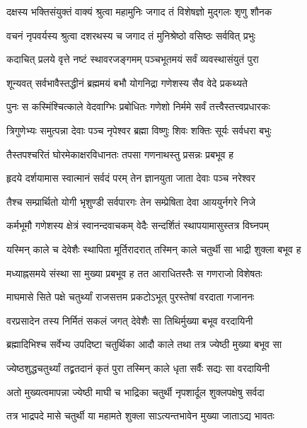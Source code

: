 \twolineshloka
{दक्षस्य भक्तिसंयुक्तं वाक्यं श्रुत्वा महामुनिः}
{जगाद तं विशेषज्ञो मुद्गलः श‍ृणु शौनक} %

\twolineshloka
{वचनं नृपवर्यस्य श्रुत्वा दशरथस्य च}
{जगाद तं मुनिश्रेष्ठो वसिष्ठः सर्ववित् प्रभुः} %


\twolineshloka
{कदाचित् प्रलये वृत्ते नष्टं स्थावरजङ्गमम्}
{पञ्चभूतमयं सर्वं व्यवस्थासंयुतं पुरा} %

\twolineshloka
{शून्यवत् सर्वभावैस्तद्धीनं ब्रह्ममयं बभौ}
{योगनिद्रा गणेशस्य सैव वेदे प्रकथ्यते} %

\twolineshloka
{पुनः स कस्मिंश्चित्काले वेदवाग्भिः प्रबोधितः}
{गणेशो निर्ममे सर्वं तत्त्वैस्तत्त्वप्रधारकः} %

\twolineshloka
{त्रिगुणेभ्यः समुत्पन्ना देवाः पञ्च नृपेश्वर}
{ब्रह्मा विष्णुः शिवः शक्तिः सूर्यः सर्वधरा बभुः} %

\twolineshloka
{तैस्तपश्चरितं घोरमेकाक्षरविधानतः}
{तपसा गणनाथस्तु प्रसन्नः प्रबभूव ह} %

\twolineshloka
{हृदये दर्शयामास स्वात्मानं सर्वदं परम्}
{तेन ज्ञानयुता जाता देवाः पञ्च नरेश्वर} %

\twolineshloka
{तैश्च सम्प्रार्थितो योगी भृशुण्डी सर्वपारगः}
{तेन सम्प्रेषिता देवा आययुर्नगरे निजे} %

\twolineshloka
{कर्मभूमौ गणेशस्य क्षेत्रं स्वानन्दवाचकम्}
{वेदैः सन्दर्शितं स्थापयामासुस्तत्र विघ्नपम्} %

\twolineshloka
{यस्मिन् काले च देवेशैः स्थापिता मूर्तिरादरात्}
{तस्मिन् काले चतुर्थी सा भाद्री शुक्ला बभूव ह} %

\twolineshloka
{मध्याह्नसमये संस्था सा मुख्या प्रबभूव ह}
{तत आराधितस्तैः स गणराजो विशेषतः} %

\twolineshloka
{माघमासे सिते पक्षे चतुर्थ्यां राजसत्तम}
{प्रकटोऽभूत् पुरस्तेषां वरदाता गजाननः} %

\twolineshloka
{वरप्रसादेन तस्य निर्मितं सकलं जगत्}
{देवेशैः सा तिथिर्मुख्या बभूव वरदायिनी} %

\twolineshloka
{ब्रह्मादिभिश्च सर्वेभ्य उपदिष्टा चतुर्थिका}
{आदौ काले तथा तत्र ज्येष्ठी मुख्या बभूव सा} %

\twolineshloka
{ज्येष्ठशुद्धचतुर्थ्यां तद्व्रतदानं कृतं पुरा}
{तस्मिन् काले धृता सर्वैः सद्यः सा वरदायिनी} %

\twolineshloka
{अतो मुख्यत्वमापन्ना ज्येष्ठी माघी च भाद्रिका}
{चतुर्थी नृपशार्दूल शुक्लपक्षेषु सर्वदा} %

\twolineshloka
{तत्र भाद्रपदे मासे चतुर्थी या महामते}
{शुक्ला साऽत्यन्तभावेन मुख्या जाताऽद्य भावतः} %

